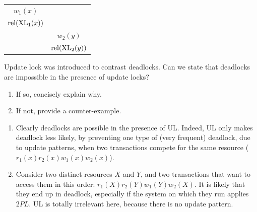 \documentclass[12pt, a4paper]{report}
\newtheorem[style=M,bodystyle=\normalfont]{theorem}{Theorem}
\newtheorem[style=M,bodystyle=\normalfont]{corollary}{Corollary}
\newtheorem[style=M,bodystyle=\normalfont]{lemma}{Lemma}
\newtheorem[style=M,bodystyle=\normalfont]{definition}{Definition}
\begin{document}
\begin{Answer}[ref=11]
\begin{table}[H]
\begin{tabular}{|c|c|}
            $w_1(x)$                                      &                                               \\
            $\textnormal{rel}(\textnormal{XL}_1(x))$      &                                               \\
                                                          & $w_2(y)$                                      \\
                                                          & $\textnormal{rel}(\textnormal{XL}_2(y))$      \\ \hline
            \end{tabular}
        \end{table}
    \end{Answer}

    \newpage

    \begin{Exercise}[label=12]
        Update lock was introduced to contrast deadlocks. Can we state that deadlocks are impossible in the presence of update locks?
        \begin{enumerate}
            \item If so, concisely explain why. 
            \item If not, provide a counter-example.
        \end{enumerate}
    \end{Exercise}
    \begin{Answer}[ref=12]
        \begin{enumerate}
            \item Clearly deadlocks are possible in the presence of UL. Indeed, UL only makes deadlock less likely, by preventing one type of (very frequent) deadlock, due to 
                update patterns, when two transactions compete for the same resource ($r_1(x) r_2(x) w_1(x) w_2(x)$). 
            \item Consider two distinct resources $X$ and $Y$, and two transactions that want to access them in this order: $r_1(X) r_2(Y) w_1(Y) w_2(X)$. It is likely that they end up 
                in deadlock, especially if the system on which they run applies $2PL$. UL is totally irrelevant here, because there is no update pattern. 
        \end{enumerate}
    \end{Answer}
\end{document}
